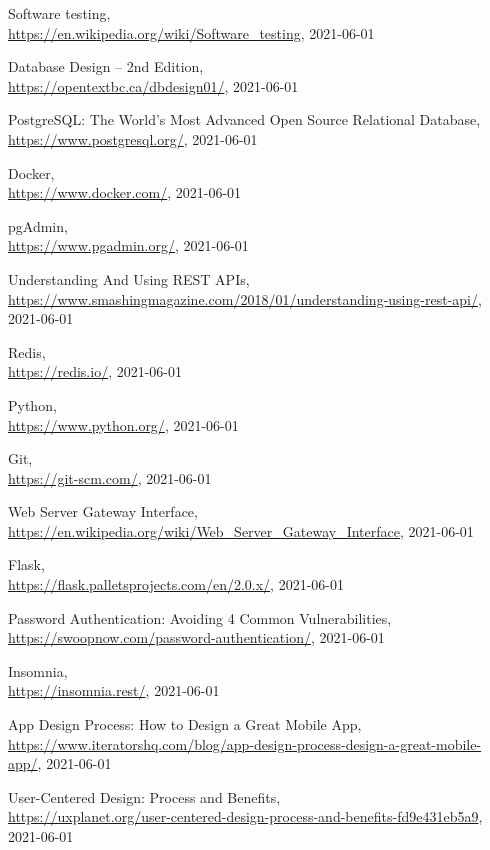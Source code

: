 \documentclass[12pt,a4paper,twoside,english,italian]{book}
\begin{document}
\begin{thebibliography}{99}
Software testing, \\\url{https://en.wikipedia.org/wiki/Software_testing}, 2021-06-01

Database Design – 2nd Edition, \\\url{https://opentextbc.ca/dbdesign01/}, 2021-06-01

PostgreSQL: The World's Most Advanced Open Source Relational Database, \\\url{https://www.postgresql.org/}, 2021-06-01

Docker, \\\url{https://www.docker.com/}, 2021-06-01

pgAdmin, \\\url{https://www.pgadmin.org/}, 2021-06-01

Understanding And Using REST APIs, \\\url{https://www.smashingmagazine.com/2018/01/understanding-using-rest-api/}, 2021-06-01

Redis, \\\url{https://redis.io/}, 2021-06-01

Python, \\\url{https://www.python.org/}, 2021-06-01

Git, \\\url{https://git-scm.com/}, 2021-06-01

Web Server Gateway Interface, \\\url{https://en.wikipedia.org/wiki/Web_Server_Gateway_Interface}, 2021-06-01

Flask, \\\url{https://flask.palletsprojects.com/en/2.0.x/}, 2021-06-01

Password Authentication: Avoiding 4 Common Vulnerabilities, \\\url{https://swoopnow.com/password-authentication/}, 2021-06-01

Insomnia, \\\url{https://insomnia.rest/}, 2021-06-01

App Design Process: How to Design a Great Mobile App, \\\url{https://www.iteratorshq.com/blog/app-design-process-design-a-great-mobile-app/}, 2021-06-01

User-Centered Design: Process and Benefits, \\\url{https://uxplanet.org/user-centered-design-process-and-benefits-fd9e431eb5a9}, 2021-06-01


\end{thebibliography}
\end{document}
